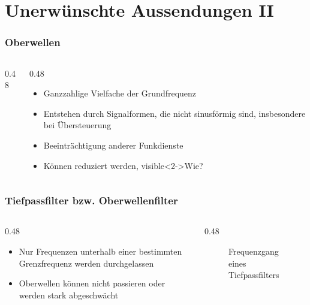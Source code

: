 \section{Unerwünschte Aussendungen II}
\label{section:unerwuenschte_aussendungen_2}
\begin{frame}\frametitle{Oberwellen}
    \begin{columns}
        \begin{column}{0.48\linewidth}
        \end{column}
        \begin{column}{0.48\linewidth}
            \begin{itemize}
                \item Ganzzahlige Vielfache der Grundfrequenz
                \item Entstehen durch Signalformen, die nicht sinusförmig sind, insbesondere bei Übersteuerung
                \item Beeinträchtigung anderer Funkdienste
                \item Können reduziert werden, visible<2->{Wie?}
            \end{itemize}
        \end{column}
    \end{columns}
\end{frame}

\begin{frame}
    \frametitle{Tiefpassfilter bzw. Oberwellenfilter}
    \begin{columns}
        \begin{column}{0.48\textwidth}
            \begin{itemize}
                \item Nur Frequenzen unterhalb einer bestimmten Grenzfrequenz werden durchgelassen
                \item Oberwellen können nicht passieren oder werden stark abgeschwächt
            \end{itemize}
        \end{column}
        \begin{column}{0.48\textwidth}
            \begin{figure}
                \caption{\scriptsize Frequenzgang eines Tiefpassfilters}
                \label{tiefpass}
            \end{figure}
        \end{column}
    \end{columns}
\end{frame}



